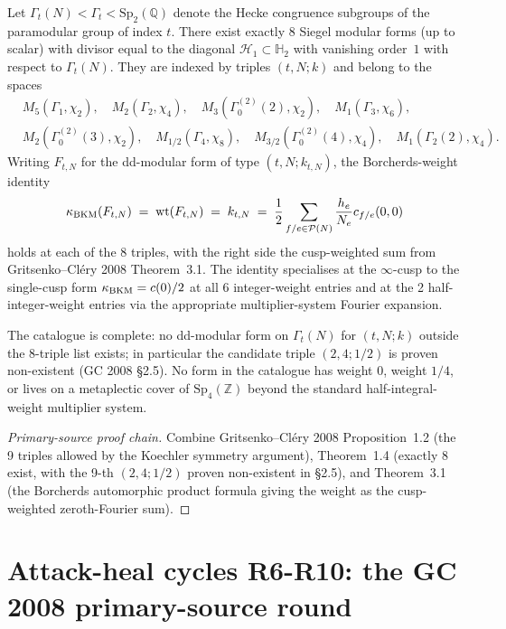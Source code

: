 \begin{theorem*}
Let $\Gamma_t(N) < \Gamma_t < \mathrm{Sp}_2(\mathbb{Q})$ denote the
Hecke congruence subgroups of the paramodular group of index $t$. There
exist exactly $8$ Siegel modular forms (up to scalar) with divisor
equal to the diagonal $\mathcal{H}_1 \subset \mathbb{H}_2$ with
vanishing order~$1$ with respect to $\Gamma_t(N)$. They are indexed by
triples $(t, N; k)$ and belong to the spaces
\[
\begin{aligned}
 &M_5(\Gamma_1, \chi_2),\quad M_2(\Gamma_2, \chi_4),\quad
  M_3(\Gamma_0^{(2)}(2), \chi_2),\quad M_1(\Gamma_3, \chi_6),\quad \\
 &M_2(\Gamma_0^{(2)}(3), \chi_2),\quad M_{1/2}(\Gamma_4, \chi_8),\quad
  M_{3/2}(\Gamma_0^{(2)}(4), \chi_4),\quad M_1(\Gamma_2(2), \chi_4).
\end{aligned}
\]
Writing $F_{t, N}$ for the dd-modular form of type $(t, N; k_{t, N})$,
the Borcherds-weight identity
\[
 \kappa_{\mathrm{BKM}}(F_{t, N}) \;=\; \mathrm{wt}(F_{t, N}) \;=\; k_{t, N}
   \;=\; \frac{1}{2} \sum_{f/e \in \mathcal{P}(N)} \frac{h_e}{N_e}
      c_{f/e}(0, 0)
\]
holds at each of the 8 triples, with the right side the cusp-weighted
sum from Gritsenko--Cl\'ery 2008 Theorem~3.1. The identity specialises
at the $\infty$-cusp to the single-cusp form $\kappa_{\mathrm{BKM}} = c(0)/2$ at all 6
integer-weight entries and at the 2 half-integer-weight entries via
the appropriate multiplier-system Fourier expansion.

The catalogue is complete: no dd-modular form on $\Gamma_t(N)$ for
$(t, N; k)$ outside the 8-triple list exists; in particular the
candidate triple $(2, 4; 1/2)$ is proven non-existent (GC 2008 \S 2.5).
No form in the catalogue has weight $0$, weight $1/4$, or lives on a
metaplectic cover of $\mathrm{Sp}_4(\mathbb{Z})$ beyond the standard
half-integral-weight multiplier system.
\end{theorem*}

\begin{proof}[Primary-source proof chain]
Combine Gritsenko--Cl\'ery 2008 Proposition~1.2 (the 9 triples
allowed by the Koechler symmetry argument), Theorem~1.4 (exactly 8
exist, with the 9-th $(2, 4; 1/2)$ proven non-existent in \S 2.5), and
Theorem~3.1 (the Borcherds automorphic product formula giving the
weight as the cusp-weighted zeroth-Fourier sum).
\end{proof}

\section*{Attack-heal cycles R6-R10: the GC 2008 primary-source round}

